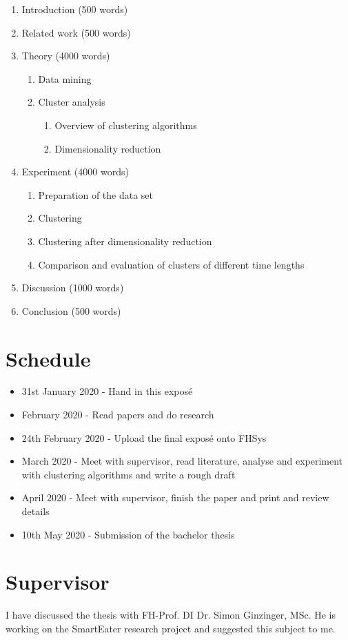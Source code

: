 \documentclass[12pt,a4paper]{article}
\begin{document}
\begin{enumerate}
	\item Introduction (500 words)
	\item Related work (500 words)
	\item Theory (4000 words)
	\begin{enumerate}
		\item Data mining 
		\item Cluster analysis
		\begin{enumerate}
			\item Overview of clustering algorithms
			\item Dimensionality reduction
		\end{enumerate}
	\end{enumerate}
	\item Experiment (4000 words)
	\begin{enumerate}
		\item Preparation of the data set
		\item Clustering
		\item Clustering after dimensionality reduction
		\item Comparison and evaluation of clusters of different time lengths
	\end{enumerate}
	\item Discussion (1000 words)
	\item Conclusion (500 words)
\end{enumerate}

\nocite{*}
\printbibliography

\section*{Schedule}

\begin{itemize}
	\item 31st January 2020 - Hand in this exposé
	\item February 2020 - Read papers and do research
	\item 24th February 2020 - Upload the final exposé onto FHSys
	\item March 2020 - Meet with supervisor, read literature, analyse and experiment with clustering algorithms and write a rough draft
	\item April 2020 - Meet with supervisor, finish the paper and print and review details
	\item 10th May 2020 - Submission of the bachelor thesis
\end{itemize}

\section*{Supervisor}

I have discussed the thesis with FH-Prof. DI Dr. Simon Ginzinger, MSc. He is working on the SmartEater research project and suggested this subject to me.
\end{document}
